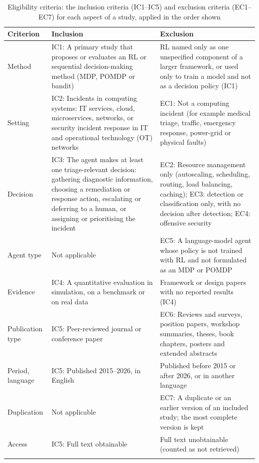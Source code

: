 \documentclass[pdflatex,sn-basic]{sn-jnl}
\begin{document}
\begin{table}[!htbp]
\caption{Eligibility criteria: the inclusion criteria (IC1--IC5) and exclusion criteria (EC1--EC7) for each aspect of a study, applied in the order shown}\label{tab:criteria}
\footnotesize
\begin{tabularx}{\textwidth}{@{}P{1.6cm}LL@{}}
\toprule
Criterion & Inclusion & Exclusion \\
\midrule
Method & IC1: A primary study that proposes or evaluates an RL or sequential decision-making method (MDP, POMDP or bandit) & RL named only as one unspecified component of a larger framework, or used only to train a model and not as a decision policy (IC1) \\
Setting & IC2: Incidents in computing systems: IT services, cloud, microservices, networks, or security incident response in IT and operational technology (OT) networks & EC1: Not a computing incident (for example medical triage, traffic, emergency response, power-grid or physical faults) \\
Decision & IC3: The agent makes at least one triage-relevant decision: gathering diagnostic information, choosing a remediation or response action, escalating or deferring to a human, or assigning or prioritising the incident & EC2: Resource management only (autoscaling, scheduling, routing, load balancing, caching); EC3: detection or classification only, with no decision after detection; EC4: offensive security \\
Agent type & Not applicable & EC5: A language-model agent whose policy is not trained with RL and not formulated as an MDP or POMDP \\
Evidence & IC4: A quantitative evaluation in simulation, on a benchmark or on real data & Framework or design papers with no reported results (IC4) \\
Publication type & IC5: Peer-reviewed journal or conference paper & EC6: Reviews and surveys, position papers, workshop summaries, theses, book chapters, posters and extended abstracts \\
Period, language & IC5: Published 2015--2026, in English & Published before 2015 or after 2026, or in another language \\
Duplication & Not applicable & EC7: A duplicate or an earlier version of an included study; the most complete version is kept \\
Access & IC5: Full text obtainable & Full text unobtainable (counted as not retrieved) \\
\botrule
\end{tabularx}
\end{table}
\end{document}
